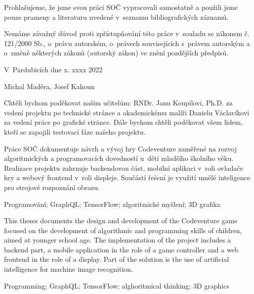 
\noindent Prohlašujeme, že jsme svou práci SOČ vypracovali samostatně a použili jsme pouze prameny a literaturu uvedené v~seznamu bibliografických záznamů.

\noindent Nemáme závažný důvod proti zpřístupňování této práce v~souladu se zákonem č. 121/2000 Sb., o~právu autorském, o~právech souvisejících s~právem autorským a o~změně některých zákonů (autorský zákon) ve znění pozdějších předpisů. 

\vspace{24 pt}

\noindent V~Pardubicích dne x. xxxx 2022 \dotfill{} 

\hspace{6cm} Michal Maděra, Josef Kahoun

\cleardoublepage

\vspace*{0.8\textheight}

\noindent
Chtěli bychom poděkovat našim učitelům: RNDr. Janu Koupilovi, Ph.D. za vedení projektu po technické stránce a akademickému malíři Danielu Václavíkovi za vedení práce po grafické stránce. Dále bychom chtěli poděkovat všem lidem, kteří se zapojili testovací fáze našeho projektu.

\cleardoublepage


\noindent Práce SOČ dokumentuje návrh a vývoj hry Codeventure zaměřené na rozvoj algoritmických a programovacích dovedností u~dětí mladšího školního věku. Realizace projektu zahrnuje backendovou část, mobilní aplikaci v~roli ovladače hry a webový frontend v~roli displeje. Součástí řešení je využití umělé inteligence pro strojové rozpoznání obrazu.

\vspace{18pt}


\noindent Programování; GraphQL; TensorFlow; algoritmické myšlení; 3D grafika

\vspace{18pt}


\noindent This theses documents the design and development of the Codeventure game focused on the development of algorithmic and programming skills of children, aimed at younger school age. The implementation of the project includes a backend part, a mobile application in the role of a game controller and a web frontend in the role of a display. Part of the solution is the use of artificial intelligence for machine image recognition.

\vspace{18pt}


\noindent Programming; GraphQL; TensorFlow; alghoritmical thinking; 3D graphics

\cleardoublepage

\tableofcontents